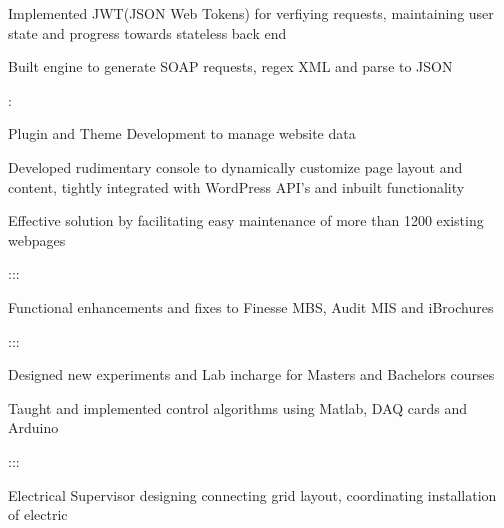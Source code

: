 \documentclass[]{hemant-style}
\begin{document}
\begin{minipage}[]{\textwidth}
\begin{minipage}{\textwidth}
\begin{minipage}[t][][c]{.75\textwidth}
\begin{hitemize}
                                \item Implemented JWT(JSON Web Tokens) for verfiying requests, maintaining user state and progress towards stateless back end
                                \item Built engine to generate SOAP requests, regex XML and parse to JSON 
                            \end{hitemize}
                            :
                            \begin{hitemize}
                                \item Plugin and Theme Development to manage website data
                                \item Developed rudimentary console to dynamically customize page layout and content, tightly integrated with WordPress API's and inbuilt functionality
                                \item Effective solution by facilitating easy maintenance of more than 1200 existing webpages
                            \end{hitemize}
                            :::
                            \begin{hitemize}
                                \item Functional enhancements and fixes to Finesse MBS, Audit MIS and iBrochures
                            \end{hitemize}
                            :::
                            \begin{hitemize}
                                \item Designed new experiments and Lab incharge for Masters and Bachelors courses
                                \item Taught and implemented control algorithms using Matlab, DAQ cards and Arduino
                            \end{hitemize}
                            :::
                            \begin{hitemize}
                                \item Electrical Supervisor designing connecting grid layout, coordinating installation of electric

\end{hitemize}
\end{minipage}
\end{minipage}
\end{minipage}
\end{document}
